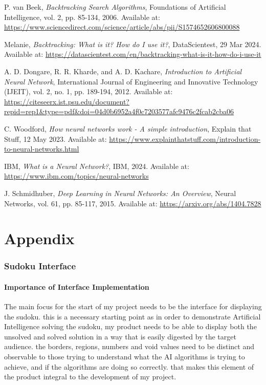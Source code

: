 \documentclass[]{final_report}
\begin{document}
\begin{thebibliography}{99}
 P. van Beek, \textit{Backtracking Search Algorithms}, Foundations of Artificial Intelligence, vol. 2, pp. 85-134, 2006. Available at: \url{https://www.sciencedirect.com/science/article/abs/pii/S1574652606800088}

 Melanie, \textit{Backtracking: What is it? How do I use it?}, DataScientest, 29 Mar 2024. Available at: \url{https://datascientest.com/en/backtracking-what-is-it-how-do-i-use-it}

 A. D. Dongare, R. R. Kharde, and A. D. Kachare, \textit{Introduction to Artificial Neural Network}, International Journal of Engineering and Innovative Technology (IJEIT), vol. 2, no. 1, pp. 189-194, 2012. Available at: \url{https://citeseerx.ist.psu.edu/document?repid=rep1&type=pdf&doi=04d0b6952a4f0c7203577afc9476c2fcab2cba06} 

 C. Woodford, \textit{How neural networks work - A simple introduction}, Explain that Stuff, 12 May 2023. Available at: \url{https://www.explainthatstuff.com/introduction-to-neural-networks.html} 

 IBM, \textit{What is a Neural Network?}, IBM, 2024. Available at: \url{https://www.ibm.com/topics/neural-networks} 

 J. Schmidhuber, \textit{Deep Learning in Neural Networks: An Overview}, Neural Networks, vol. 61, pp. 85-117, 2015. Available at: \url{https://arxiv.org/abs/1404.7828}

\end{thebibliography}
\label{endpage}

\chapter*{Appendix}
\subsection*{Sudoku Interface}

\subsubsection{Importance of Interface Implementation}

The main focus for the start of my project needs to be the interface for displaying the sudoku. this is a necessary starting point as in order to demonstrate Artificial Intelligence solving the sudoku, my product needs to be able to display both the unsolved and solved solution in a way that is easily digested by the target audience. the borders, regions, numbers and void values need to be distinct and observable to those trying to understand what the AI algorithms is trying to achieve, and if the algorithms are doing so correctly. that makes this element of the product integral to the development of my project. 
\end{document}
